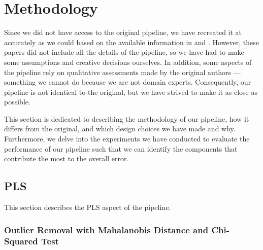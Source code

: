 \section{Methodology}\label{sec:methodology}
Since we did not have access to the original pipeline, we have recreated it at accurately as we could based on the available information in \citeauthor{andersonImprovedAccuracyQuantitative2017} and \citeauthor{cleggRecalibrationMarsScience2017}.
However, these papers did not include all the details of the pipeline, so we have had to make some assumptions and creative decisions ourselves.
In addition, some aspects of the pipeline rely on qualitative assessments made by the original authors --- something we cannot do because we are not domain experts.
Consequently, our pipeline is not identical to the original, but we have strived to make it as close as possible.

This section is dedicated to describing the methodology of our pipeline, how it differs from the original, and which design choices we have made and why.
Furthermore, we delve into the experiments we have conducted to evaluate the performance of our pipeline such that we can identify the components that contribute the most to the overall error.

\subsection{PLS}
This section describes the PLS aspect of the pipeline.

\subsubsection{Outlier Removal with Mahalanobis Distance and Chi-Squared Test}

